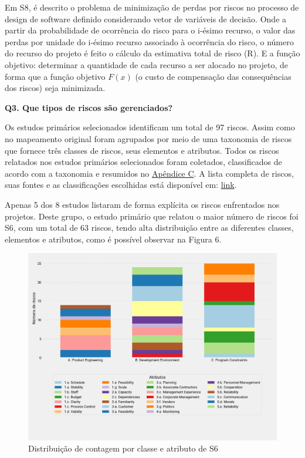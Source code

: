 \documentclass[
	12pt,
	openright,
	twoside,
	a4paper,
	english,
	brazil
	]{abntex2}
\begin{document}
Em S8, é descrito o problema de minimização de perdas por riscos no processo de design de software definido considerando vetor de variáveis de decisão. Onde a partir da probabilidade de ocorrência do risco para o i-ésimo recurso, o valor das perdas por unidade do i-ésimo recurso associado à ocorrência do risco, o número do recurso do projeto é feito o cálculo da estimativa total de risco (R). E a função objetivo: determinar a quantidade de cada recurso a ser alocado no projeto, de forma que a função objetivo \(F(x)\) (o custo de compensação das consequências dos riscos) seja minimizada.

\textbf{Q3. Que tipos de riscos são gerenciados?}

Os estudos primários selecionados identificam um total de 97 riscos. Assim como no mapeamento original foram agrupados por meio de uma taxonomia de riscos que fornece três classes de riscos, seus elementos e atributos. Todos os riscos relatados nos estudos primários selecionados foram coletados, classificados de acordo com a taxonomia e resumidos no \hyperref[apendiceC]{Apêndice C}. A lista completa de riscos, suas fontes e as classificações escolhidas está disponível em: \href{https://docs.google.com/spreadsheets/d/1YY_yjyBefJ3ZmnEY38TM_LnZLoJcKhrw_q0BdEvqx2E/edit?usp=drivesdk}{link}.

Apenas 5 dos 8 estudos listaram de forma explícita os riscos enfrentados nos projetos. Deste grupo, o estudo primário que relatou o maior número de riscos foi S6, com um total de 63 riscos, tendo alta distribuição entre as diferentes classes, elementos e atributos, como é possível observar na Figura 6.

\begin{figure}[H]
	\caption{\label{dist-contagem-classe-atributo}Distribuição de contagem por classe e atributo de S6}
  \includegraphics[width=\textwidth]{dist-contagem-classe-atributo}
\end{figure}
\end{document}
